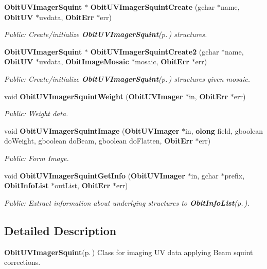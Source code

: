 \begin{CompactItemize}
{\bf Obit\-UVImager\-Squint} $\ast$ {\bf Obit\-UVImager\-Squint\-Create} (gchar $\ast$name, {\bf Obit\-UV} $\ast$uvdata, {\bf Obit\-Err} $\ast$err)
\begin{CompactList}\small\item\em Public: Create/initialize {\bf Obit\-UVImager\-Squint}{\rm (p.\,\pageref{structObitUVImagerSquint})} structures. \item\end{CompactList}\item 
{\bf Obit\-UVImager\-Squint} $\ast$ {\bf Obit\-UVImager\-Squint\-Create2} (gchar $\ast$name, {\bf Obit\-UV} $\ast$uvdata, {\bf Obit\-Image\-Mosaic} $\ast$mosaic, {\bf Obit\-Err} $\ast$err)
\begin{CompactList}\small\item\em Public: Create/initialize {\bf Obit\-UVImager\-Squint}{\rm (p.\,\pageref{structObitUVImagerSquint})} structures given mosaic. \item\end{CompactList}\item 
void {\bf Obit\-UVImager\-Squint\-Weight} ({\bf Obit\-UVImager} $\ast$in, {\bf Obit\-Err} $\ast$err)
\begin{CompactList}\small\item\em Public: Weight data. \item\end{CompactList}\item 
void {\bf Obit\-UVImager\-Squint\-Image} ({\bf Obit\-UVImager} $\ast$in, {\bf olong} field, gboolean do\-Weight, gboolean do\-Beam, gboolean do\-Flatten, {\bf Obit\-Err} $\ast$err)
\begin{CompactList}\small\item\em Public: Form Image. \item\end{CompactList}\item 
void {\bf Obit\-UVImager\-Squint\-Get\-Info} ({\bf Obit\-UVImager} $\ast$in, gchar $\ast$prefix, {\bf Obit\-Info\-List} $\ast$out\-List, {\bf Obit\-Err} $\ast$err)
\begin{CompactList}\small\item\em Public: Extract information about underlying structures to {\bf Obit\-Info\-List}{\rm (p.\,\pageref{structObitInfoList})}. \item\end{CompactList}\end{CompactItemize}


\subsection{Detailed Description}
{\bf Obit\-UVImager\-Squint}{\rm (p.\,\pageref{structObitUVImagerSquint})} Class for imaging UV data applying Beam squint corrections. 

